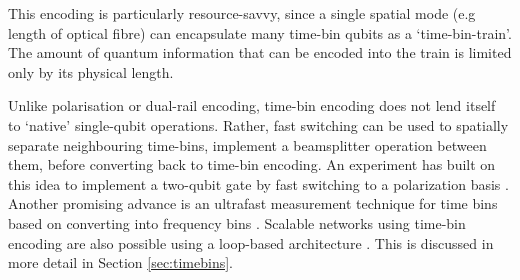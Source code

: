 \documentclass[times,final]{elsarticle}
\newcommand{\ket}[1]{|#1\rangle}
\begin{document}
This encoding is particularly resource-savvy, since a single spatial mode (e.g length of optical fibre) can encapsulate many time-bin qubits as a `time-bin-train'. The amount of quantum information that can be encoded into the train is limited only by its physical length.

Unlike polarisation or dual-rail encoding, time-bin encoding does not lend itself to `native' single-qubit operations. Rather, fast switching can be used to spatially separate neighbouring time-bins, implement a beamsplitter operation between them, before converting back to time-bin encoding. An experiment has built on this idea to implement a two-qubit gate by fast switching to a polarization basis \cite{bib:Humphreys2013}. Another promising advance is an ultrafast measurement technique for time bins based on converting into frequency bins \cite{bib:Donohue2013}. Scalable networks using time-bin encoding are also possible using a loop-based architecture \cite{bib:Motes14}. This is discussed in more detail in Section \ref{sec:timebins}.



\end{document}
